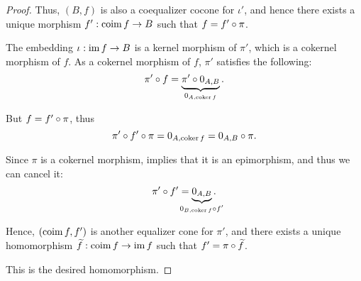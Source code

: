 \begin{proof}
  Thus, \( (B, f) \) is also a coequalizer cocone for \( \iota' \), and hence there exists a unique morphism \( f': \operatorname*{co\negthinspace\operatorname{im}} f \to B \) such that \( f = f' \bincirc \pi \).

   The embedding \( \iota: \operatorname{im} f \to B \) is a kernel morphism of \( \pi' \), which is a cokernel morphism of \( f \). As a cokernel morphism of \( f \), \( \pi' \) satisfies the following:
  \begin{equation*}
    \pi' \bincirc f = \underbrace{\pi' \bincirc 0_{A,B}}_{0_{A,\co\ker f}}.
  \end{equation*}

  But \( f = f' \bincirc \pi \), thus
  \begin{equation*}
    \pi' \bincirc f' \bincirc \pi = 0_{A,\co\ker f} = 0_{A,B} \bincirc \pi.
  \end{equation*}

  Since \( \pi \) is a cokernel morphism,  implies that it is an epimorphism, and thus we can cancel it:
  \begin{equation*}
    \pi' \bincirc f' = \underbrace{0_{A,B}}_{\mathclap{0_{B,\co\ker f} \bincirc f'}}.
  \end{equation*}

  Hence, \( (\operatorname*{co\negthinspace\operatorname{im}} f, f') \) is another equalizer cone for \( \pi' \), and there exists a unique homomorphism \( \widetilde{f}: \operatorname*{co\negthinspace\operatorname{im}} f \to \operatorname{im} f \) such that \( f' = \pi \bincirc \widetilde{f} \).

  This is the desired homomorphism.
\end{proof}

